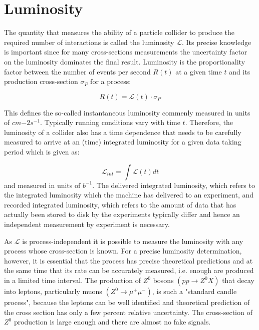 \section{Luminosity}

The quantity that measures the ability of a particle collider to produce the required number of interactions is called the luminosity $\mathcal{L}$. Its precise knowledge is important since for many cross-sections measurements the uncertainty factor on the luminosity dominates the final result. Luminosity is the proportionality factor between the number of events per second $R(t)$ at a given time $t$ and its production cross-section $\sigma_{P}$ for a process:

\begin{equation} \label{eq:rate}
R(t) = \mathcal{L}(t) \cdot \sigma_{P}
\end{equation}

This defines the so-called instantaneous luminosity commenly measured in units of $cm{-2} s^{-1}$. Typically running conditions vary with time $t$. Therefore, the luminosity of a collider also has a time dependence that needs to be carefully measured to arrive at an (time) integrated luminosity for a given data taking period which is given as:

\begin{equation} \label{eq:instLumi}
\mathcal{L}_{int} = \int \mathcal{L}(t) dt
\end{equation}
and measured in units of $b^{-1}$. The delivered integrated luminosity, which refers to the integrated luminosity which the machine has delivered to an experiment, and recorded integrated luminosity, which refers to the amount of data that has actually been stored to disk by the experiments typically differ and hence an independent measurement by experiment is necessary.

As $\mathcal{L}$ is process-independent it is possible to measure the luminosity with any process whose cross-section is known. For a precise luminosity determination, however, it is essential that the process has precise theoretical predictions and at the same time that its rate can be accurately measured, i.e. enough are produced in a limited time interval. The production of $Z^{0}$ bosons $(pp \rightarrow Z^{0} X) $ that decay into leptons, particularly muons $(Z^{0} \rightarrow \mu^{+} \mu^{-})$, is such a "standard candle process", because the leptons can be well identified and theoretical prediction of the cross section has only a few percent relative uncertainty. The cross-section of $Z^{0}$ production is large enough and there are almost no fake signals.


